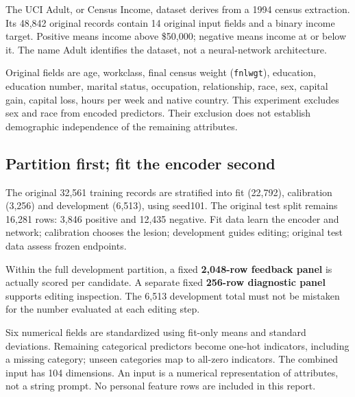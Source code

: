 The UCI Adult, or Census Income, dataset derives from a 1994 census extraction. Its 48,842 original records contain 14 original input fields and a binary income target. Positive means income above \$50,000; negative means income at or below it. The name Adult identifies the dataset, not a neural-network architecture.

Original fields are age, workclass, final census weight (\texttt{fnlwgt}), education, education number, marital status, occupation, relationship, race, sex, capital gain, capital loss, hours per week and native country. This experiment excludes sex and race from encoded predictors. Their exclusion does not establish demographic independence of the remaining attributes.

\subsection*{Partition first; fit the encoder second}
The original 32,561 training records are stratified into fit (22,792), calibration (3,256) and development (6,513), using seed101. The original test split remains 16,281 rows: 3,846 positive and 12,435 negative. Fit data learn the encoder and network; calibration chooses the lesion; development guides editing; original test data assess frozen endpoints.

Within the full development partition, a fixed \textbf{2,048-row feedback panel} is actually scored per candidate. A separate fixed \textbf{256-row diagnostic panel} supports editing inspection. The 6,513 development total must not be mistaken for the number evaluated at each editing step.

Six numerical fields are standardized using fit-only means and standard deviations. Remaining categorical predictors become one-hot indicators, including a missing category; unseen categories map to all-zero indicators. The combined input has 104 dimensions. An input is a numerical representation of attributes, not a string prompt. No personal feature rows are included in this report.


